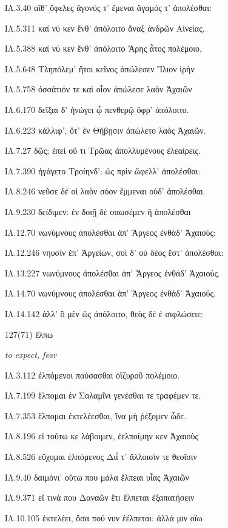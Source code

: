 \begin{enumerate}
{ΙΛ.3.40 αἴθ' ὄφελες ἄγονός τ' ἔμεναι ἄγαμός τ' ἀπολέσθαι:

ΙΛ.5.311 καί νύ κεν ἔνθ' ἀπόλοιτο ἄναξ ἀνδρῶν Αἰνείας,

ΙΛ.5.388 καί νύ κεν ἔνθ' ἀπόλοιτο Ἄρης ἆτος πολέμοιο,

ΙΛ.5.648 Τληπόλεμ' ἤτοι κεῖνος ἀπώλεσεν Ἴλιον ἱρὴν

ΙΛ.5.758 ὁσσάτιόν τε καὶ οἷον ἀπώλεσε λαὸν Ἀχαιῶν

ΙΛ.6.170 δεῖξαι δ' ἠνώγει ᾧ πενθερῷ ὄφρ' ἀπόλοιτο.

ΙΛ.6.223 κάλλιφ', ὅτ' ἐν Θήβῃσιν ἀπώλετο λαὸς Ἀχαιῶν.

ΙΛ.7.27 δῷς; ἐπεὶ οὔ τι Τρῶας ἀπολλυμένους ἐλεαίρεις.

ΙΛ.7.390 ἠγάγετο Τροίηνδ': ὡς πρὶν ὤφελλ' ἀπολέσθαι:

ΙΛ.8.246 νεῦσε δέ οἱ λαὸν σόον ἔμμεναι οὐδ' ἀπολέσθαι.

ΙΛ.9.230 δείδιμεν: ἐν δοιῇ δὲ σαωσέμεν ἢ ἀπολέσθαι

ΙΛ.12.70 νωνύμνους ἀπολέσθαι ἀπ' Ἄργεος ἐνθάδ' Ἀχαιούς:

ΙΛ.12.246 νηυσὶν ἐπ' Ἀργείων, σοὶ δ' οὐ δέος ἔστ' ἀπολέσθαι:

ΙΛ.13.227 νωνύμνους ἀπολέσθαι ἀπ' Ἄργεος ἐνθάδ' Ἀχαιούς.

ΙΛ.14.70 νωνύμνους ἀπολέσθαι ἀπ' Ἄργεος ἐνθάδ' Ἀχαιούς.

ΙΛ.14.142 ἀλλ' ὃ μὲν ὣς ἀπόλοιτο, θεὸς δέ ἑ σιφλώσειε:

}

\clearpage
\item[\large 127(71)]{\large \g ἔλπω}

\hspace{0.2cm} \textit{ to expect, fear  }

{\g
ΙΛ.3.112 ἐλπόμενοι παύσασθαι ὀϊζυροῦ πολέμοιο.

ΙΛ.7.199 ἔλπομαι ἐν Σαλαμῖνι γενέσθαι τε τραφέμεν τε.

ΙΛ.7.353 ἔλπομαι ἐκτελέεσθαι, ἵνα μὴ ῥέξομεν ὧδε.

ΙΛ.8.196 εἰ τούτω κε λάβοιμεν, ἐελποίμην κεν Ἀχαιοὺς

ΙΛ.8.526 εὔχομαι ἐλπόμενος Διΐ τ' ἄλλοισίν τε θεοῖσιν

ΙΛ.9.40 δαιμόνι' οὕτω που μάλα ἔλπεαι υἷας Ἀχαιῶν

ΙΛ.9.371 εἴ τινά που Δαναῶν ἔτι ἔλπεται ἐξαπατήσειν

ΙΛ.10.105 ἐκτελέει, ὅσα πού νυν ἐέλπεται: ἀλλά μιν οἴω

}
\end{enumerate}
